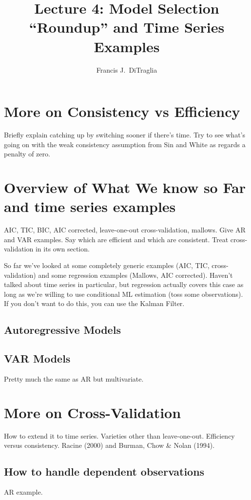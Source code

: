 \documentclass[12pt]{article}
\theoremstyle{definition}
\begin{document}
\title{Lecture 4: Model Selection ``Roundup'' and Time Series Examples}

\author{Francis J.\ DiTraglia}

\maketitle 

\section{More on Consistency vs Efficiency}
Briefly explain catching up by switching sooner if there's time. Try to see what's going on with the weak consistency assumption from Sin and White as regards a penalty of zero.

\section{Overview of What We know so Far and time series examples}
AIC, TIC, BIC, AIC corrected, leave-one-out cross-validation, mallows. Give AR and VAR examples. Say which are efficient and which are consistent. Treat cross-validation in its own section.

So far we've looked at some completely generic examples (AIC, TIC, cross-validation) and some regression examples (Mallows, AIC corrected). Haven't talked about time series in particular, but regression actually covers this case as long as we're willing to use conditional ML estimation (toss some observations). If you don't want to do this, you can use the Kalman Filter.

\subsection{Autoregressive Models}

\subsection{VAR Models}
Pretty much the same as AR but multivariate.

\section{More on Cross-Validation}
How to extend it to time series. Varieties other than leave-one-out. Efficiency versus consistency. Racine (2000) and Burman, Chow \& Nolan (1994).

\subsection{How to handle dependent observations}
AR example.
\end{document}
